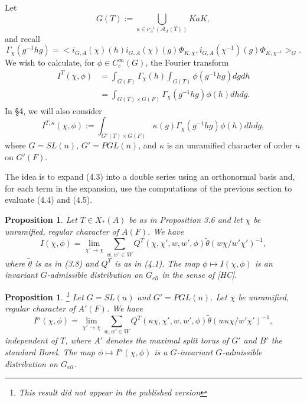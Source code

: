 \documentclass[12pt]{article}
\newtheorem{proposition}[lemma]{Proposition}
\begin{document}
Let
\begin{equation}\tag{4.2}
G(T):=\bigcup_{a\in\nu_A^{-1}(\mathcal{A}_A(T))}KaK,
\end{equation}
and recall
\begin{equation}\tag{4.3}
\Gamma_\chi(g^{-1}hg)=<i_{G,A}(\chi)(h)i_{G,A}(\chi)(g)\Phi_{K,\chi},i_{G,A}(\chi^{-1})(g)\Phi_{K,\chi^{-1}}>_G.
\end{equation}
We wish to calculate, for $\phi\in C_c^\infty(G)$, the Fourier transform
\begin{equation}\tag{4.4}
\begin{array}{rl}
I^T(\chi,\phi)&=\int_{G(F)}\Gamma_\chi(h)\int_{G(T)}\phi(g^{-1}hg)dgdh\\
&=\int_{G(T)\times G(F)}\Gamma_\chi(g^{-1}hg)\phi(h)dhdg.
\end{array}
\end{equation}
In \S4, we will also consider
\begin{equation}\tag{4.5}
I^{T,\kappa}(\chi,\phi):=\int_{G'(T)\times G(F)}\kappa(g)\Gamma_\chi(g^{-1}hg)\phi(h)dhdg,
\end{equation}
where $G=SL(n)$, $G'=PGL(n)$, and $\kappa$ is an unramified character of order $n$ on $G'(F)$.

The idea is to expand (4.3) into a double series using an orthonormal basis and, for each term in the expansion, use the computations of the previous section to evaluate (4.4) and (4.5).

\begin{proposition}
Let $T\in X_*(A)$ be as in Proposition 3.6 and let $\chi$ be unramified, regular character of $A(F)$. We have
\[
I(\chi,\phi)=\lim_{\chi'\rightarrow\chi}\sum_{w,w'\in W}Q^T(\chi,\chi',w,w',\phi)\tilde\theta(w\chi/w'\chi')^{-1},
\]
where $\tilde\theta$ is as in (3.8) and $Q^T$ is as in (4.1). The map $\phi\longmapsto I(\chi,\phi)$ is an invariant $G$-admissible distribution on $G_{ell}$ in the sense of [HC].
\end{proposition}

\begin{proposition}
\footnote{This result did not appear in the published version}
Let $G=SL(n)$ and $G'=PGL(n)$. Let $\chi$ be unramified, regular character of $A'(F)$. We have
\[
I^\kappa(\chi,\phi)=\lim_{\chi'\rightarrow\chi}\sum_{w,w'\in W}Q^T(\kappa\chi,\chi',w,w',\phi)\tilde\theta(w\kappa\chi/w'\chi')^{-1},
\]
independent of $T$, where $A'$ denotes the maximal split torus of $G'$ and $B'$ the standard Borel. The map $\phi\longmapsto I^\kappa(\chi,\phi)$ is a $G$-invariant $G$-admissible distribution on $G_{ell}$.
\end{proposition}
\end{document}
